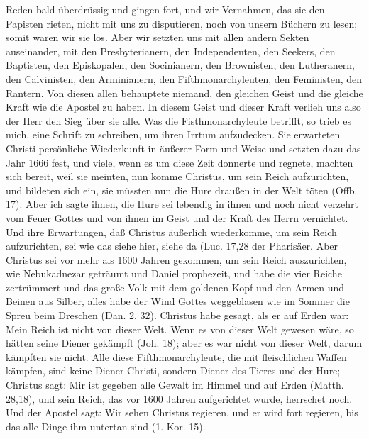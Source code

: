Reden bald überdrüssig und gingen fort, und wir Vernahmen,
das sie den Papisten rieten, nicht mit uns zu disputieren, noch
von unsern Büchern zu lesen; somit waren wir sie los. Aber
wir setzten uns mit allen andern Sekten auseinander, mit den
Presbyterianern, 
den Independenten, 
den Seekers, 
den Baptisten,
den Episkopalen, 
den Socinianern, 
den Brownisten, 
den Lutheranern,
den Calvinisten, 
den Arminianern, 
den Fifthmonarchyleuten, 
den Feministen, 
den Rantern. 
Von diesen allen behauptete niemand,
den gleichen Geist und die gleiche Kraft wie die Apostel zu haben.
In diesem Geist und dieser Kraft verlieh uns also der Herr den
Sieg über sie alle. Was die Fisthmonarchyleute betrifft, so trieb
es mich, eine Schrift zu schreiben, um ihren Irrtum aufzudecken.
Sie erwarteten Christi persönliche Wiederkunft in äußerer Form
und Weise und setzten dazu das Jahr 1666 fest, und viele, wenn
es um diese Zeit donnerte und regnete, machten sich bereit, weil
sie meinten, nun komme Christus, um sein Reich aufzurichten,
und bildeten sich ein, sie müssten nun die Hure draußen in der
Welt töten (Offb. 17). Aber ich sagte ihnen, 
die Hure sei lebendig
in ihnen und noch nicht verzehrt vom Feuer Gottes und von
ihnen im Geist und der Kraft des Herrn vernichtet. Und ihre
Erwartungen, daß Christus äußerlich wiederkomme, um sein Reich
aufzurichten, sei wie das \glqq siehe hier, siehe da\grqq{} (Luc. 
17,28 der
Pharisäer. Aber Christus sei vor mehr als 1600 Jahren gekommen, 
um sein Reich auszurichten, wie Nebukadnezar 
geträumt und Daniel prophezeit, und 
habe die vier Reiche zertrümmert und
das große Volk mit dem goldenen Kopf und den Armen und
Beinen aus Silber, alles habe der Wind Gottes weggeblasen
wie im Sommer die Spreu beim Dreschen (Dan. 2, 32).
Christus habe gesagt, als er auf Erden war: \glqq Mein Reich ist
nicht von dieser Welt.\grqq{} Wenn es von dieser Welt gewesen wäre,
so hätten seine Diener gekämpft (Joh. 18); aber es war nicht
von dieser Welt, darum kämpften sie nicht. Alle diese 
Fifthmonarchyleute, die mit fleischlichen Waffen kämpfen, sind keine
Diener Christi, sondern Diener des Tieres und der Hure; Christus
sagt: \glqq Mir ist gegeben alle Gewalt im Himmel und auf Erden\grqq{}
(Matth. 28,18), und sein Reich, das vor 
1600 Jahren aufgerichtet  wurde, herrschet noch. Und der Apostel sagt: 
\glqq Wir sehen Christus regieren, und er wird fort regieren, 
bis das alle Dinge ihm untertan sind\grqq{} (1. Kor. 15).

